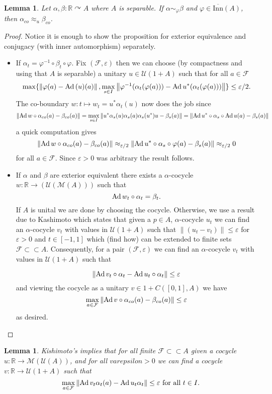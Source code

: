 \documentclass[11pt,a4paper,oneside]{amsart}
\newtheorem{lemma}[theorem]{Lemma}
\newcommand{\Ad}{{\rm Ad\,}}
\newcommand{\norm}[1]{\left\|#1\right\|} %
\newcommand{\acts}{\curvearrowright}
\begin{document}
\begin{lemma}
Let $\alpha,\beta:\mathbb{R}\acts A$ where $A$ is separable. If $\alpha\sim_{\varphi} \beta$ and $\varphi \in \overline {\mathrm{Inn}}(A)$, then $\alpha_{co}\approx_u \beta_{co}$. 
\end{lemma}

\begin{proof}
Notice it is enough to show the proposition for exterior equivalence and conjugacy (with inner automorphism) separately. \begin{itemize}
\item If $\alpha_t=\varphi^{-1}\circ\beta_t\circ \varphi$. Fix $(\mathcal F, \varepsilon)$ then we can choose (by compactness and using that $A$ is separable) a unitary $u\in \mathcal U(1+A)$ such that for all $a\in \mathcal F$  \[\max\{\norm{\varphi(a)-\Ad(u)(a)}, \max_{s\in I}\norm{\varphi^{-1}(\alpha_t(\varphi(a)))-\Ad u^*(\alpha_t(\varphi(a)))}\}\leq \varepsilon/2.\] The co-boundary $w: t\mapsto w_t=u^*\alpha_t(u)$ now does the job since \[\norm{\Ad w\circ \alpha_{co}(a)-\beta_{co}(a)}=\max_{s\in I}\norm{ u^*\alpha_s(u)\alpha_s(a)\alpha_s(u^*)u-\beta_s(a)}= \norm{\Ad u^*\circ \alpha_s\circ \Ad u(a)-\beta_s(a)}\]
a quick computation gives \[\norm{\Ad w\circ \alpha_{co}(a)-\beta_{co}(a)}\approx_{\varepsilon/2}  \norm{\Ad u^*\circ \alpha_s\circ \varphi(a)-\beta_s(a)} \approx_{\varepsilon/2}0\]
for all $a\in \mathcal F$. Since $\varepsilon>0$ was arbitrary the result follows. 

\item If $\alpha$ and $\beta$ are exterior equivalent there exists a $\alpha$-cocycle $w: \mathbb{R}\rightarrow (\mathcal U(\mathcal M(A)))$ such that \[\Ad w_t\circ \alpha_t=\beta_t.\] If $A$ is unital we are done by choosing the cocycle. Otherwise, we use a result due to Kashimoto \cite[Theorem 1.1]{kishimoto2006multiplier} which states that given a $p\in A$, $\alpha$-cocycle $u_t$ we can find an $\alpha$-cocycle $v_t$ with values in $\mathcal U(1+A)$ such that $\norm{(u_t-v_t)}\leq \varepsilon$ for $\varepsilon>0$ and $t\in [-1,1]$ which (find how) can be extended to finite sets $\mathcal F\subset \subset A$. Consequently, for a pair $(\mathcal F, \varepsilon)$ we can find an $\alpha$-cocycle $v_t$ with values in $\mathcal U(1+A)$ such that

$$\norm{\Ad v_t\circ \alpha_t- \Ad u_t\circ \alpha_t}\leq \varepsilon$$ and viewing the cocycle as a unitary  $v\in 1+C([0,1], A)$ we have \[\max_{a\in \mathcal F}\norm{\Ad v\circ \alpha_{co}(a)-\beta_{co}(a)}\leq \varepsilon\] as desired.


\end{itemize}
\end{proof}
\begin{lemma}
Kishimoto's \cite[Theorem 1.1]{kishimoto2006multiplier} implies that for all finite $\mathcal F\subset \subset A$ given a cocycle $u:\mathbb{R}\rightarrow \mathcal M(\mathcal U(A))$, and for all $varepsilon>0$ we can find a cocycle $v:\mathbb{R}\rightarrow \mathcal U(1+A)$ such that \[\max_{a\in \mathcal F}\norm{\Ad v_t \alpha_t(a)- \Ad u_t\alpha_t}\leq \varepsilon \text{ for all } t\in I.\]

\end{lemma}
\end{document}
